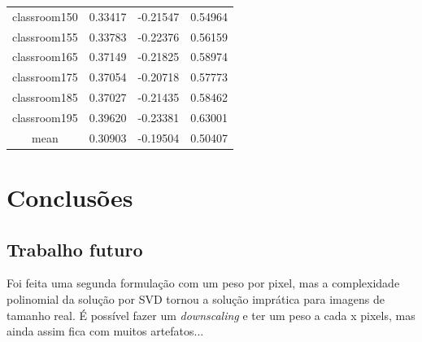 \documentclass[cic,tc]{iiufrgs}
\begin{document}
\begin{table}[h]
\begin{tabular}{c|c|c|c}
          classroom150 & 0.33417 & -0.21547 & 0.54964 \\
          classroom155 & 0.33783 & -0.22376 & 0.56159 \\
          classroom165 & 0.37149 & -0.21825 & 0.58974 \\
          classroom175 & 0.37054 & -0.20718 & 0.57773 \\
          classroom185 & 0.37027 & -0.21435 & 0.58462 \\
          classroom195 & 0.39620 & -0.23381 & 0.63001 \\
          \hline
          \hline
		  mean & 0.30903 & -0.19504 & 0.50407 \\
          \hline
        \end{tabular}
    \label{tbl:results1}
\end{table}


\chapter{Conclusões}

\section{Trabalho futuro}
Foi feita uma segunda formulação com um peso por pixel, mas a complexidade polinomial da solução por SVD tornou a solução imprática para imagens de tamanho real. É possível fazer um \textit{downscaling} e ter um peso a cada x pixels, mas ainda assim fica com muitos artefatos...



\end{document}
